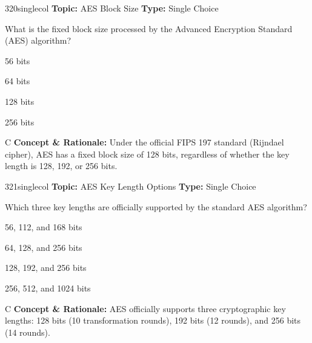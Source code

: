 \begin{qcard}{320}{singlecol}
\textcolor{darkslate!75}{\small\textbf{Topic:} AES Block Size \hfill \textbf{Type:} Single Choice}\vspace{0.4em}\par
What is the fixed block size processed by the Advanced Encryption Standard (AES) algorithm?
\begin{qoptions}
\item 56 bits
\item 64 bits
\item 128 bits
\item 256 bits
\end{qoptions}
\end{qcard}
\nopagebreak
\begin{explainbox}{C}
\textbf{Concept \& Rationale:} Under the official FIPS 197 standard (Rijndael cipher), AES has a fixed block size of 128 bits, regardless of whether the key length is 128, 192, or 256 bits.
\end{explainbox}

\begin{qcard}{321}{singlecol}
\textcolor{darkslate!75}{\small\textbf{Topic:} AES Key Length Options \hfill \textbf{Type:} Single Choice}\vspace{0.4em}\par
Which three key lengths are officially supported by the standard AES algorithm?
\begin{qoptions}
\item 56, 112, and 168 bits
\item 64, 128, and 256 bits
\item 128, 192, and 256 bits
\item 256, 512, and 1024 bits
\end{qoptions}
\end{qcard}
\nopagebreak
\begin{explainbox}{C}
\textbf{Concept \& Rationale:} AES officially supports three cryptographic key lengths: 128 bits (10 transformation rounds), 192 bits (12 rounds), and 256 bits (14 rounds).
\end{explainbox}

